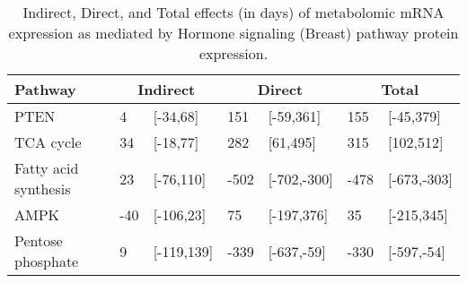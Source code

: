 \begin{table}[ht]
\centering
\begin{tabular}{lllllll}
  \hline
  Pathway & \multicolumn{2}{c}{Indirect} & \multicolumn{2}{c}{Direct}  & \multicolumn{2}{c}{Total} \\
 \hline
PTEN & 4 & [-34,68] & 151 & [-59,361] & 155 & [-45,379] \\ 
  TCA cycle & 34 & [-18,77] & 282 & [61,495] & 315 & [102,512] \\ 
  Fatty acid synthesis & 23 & [-76,110] & -502 & [-702,-300] & -478 & [-673,-303] \\ 
  AMPK & -40 & [-106,23] & 75 & [-197,376] & 35 & [-215,345] \\ 
  Pentose phosphate & 9 & [-119,139] & -339 & [-637,-59] & -330 & [-597,-54] \\ 
   \hline
\end{tabular}
\caption{Indirect, Direct, and Total effects (in days) of metabolomic mRNA expression as mediated by Hormone signaling (Breast) pathway protein expression.} 
\end{table}
